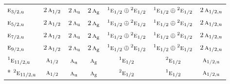 \documentclass[10pt,a4paper]{article}
\numberwithin{equation}{section}
\newcommand{\irr}[1]{\text{\normalfont\scshape #1}}
\newcommand{\conjpair}[1]{{}^{#1}}
\newcommand{\ptag}[1]{\mathrm{#1}}
\begin{document}
{\begin{longtable}{@{}lcccccc@{}}
$\irr{e}_{3/2,\ptag{u}}$ & $2\,\irr{a}_{1/2}$ & $2\,\irr{a}_{\ptag{u}}$ & $2\,\irr{a}_{\ptag{g}}$ & $\conjpair{1}\irr{e}_{1/2}\oplus \conjpair{2}\irr{e}_{1/2}$ & $\conjpair{1}\irr{e}_{1/2}\oplus \conjpair{2}\irr{e}_{1/2}$ & $2\,\irr{a}_{1/2,\ptag{u}}$\\
$\irr{e}_{5/2,\ptag{u}}$ & $2\,\irr{a}_{1/2}$ & $2\,\irr{a}_{\ptag{u}}$ & $2\,\irr{a}_{\ptag{g}}$ & $\conjpair{1}\irr{e}_{1/2}\oplus \conjpair{2}\irr{e}_{1/2}$ & $\conjpair{1}\irr{e}_{1/2}\oplus \conjpair{2}\irr{e}_{1/2}$ & $2\,\irr{a}_{1/2,\ptag{u}}$\\
$\irr{e}_{7/2,\ptag{u}}$ & $2\,\irr{a}_{1/2}$ & $2\,\irr{a}_{\ptag{u}}$ & $2\,\irr{a}_{\ptag{g}}$ & $\conjpair{1}\irr{e}_{1/2}\oplus \conjpair{2}\irr{e}_{1/2}$ & $\conjpair{1}\irr{e}_{1/2}\oplus \conjpair{2}\irr{e}_{1/2}$ & $2\,\irr{a}_{1/2,\ptag{u}}$\\
$\irr{e}_{9/2,\ptag{u}}$ & $2\,\irr{a}_{1/2}$ & $2\,\irr{a}_{\ptag{u}}$ & $2\,\irr{a}_{\ptag{g}}$ & $\conjpair{1}\irr{e}_{1/2}\oplus \conjpair{2}\irr{e}_{1/2}$ & $\conjpair{1}\irr{e}_{1/2}\oplus \conjpair{2}\irr{e}_{1/2}$ & $2\,\irr{a}_{1/2,\ptag{u}}$\\
$\conjpair{1}\irr{e}_{11/2,\ptag{u}}$ & $\irr{a}_{1/2}$ & $\irr{a}_{\ptag{u}}$ & $\irr{a}_{\ptag{g}}$ & $\conjpair{1}\irr{e}_{1/2}$ & $\conjpair{2}\irr{e}_{1/2}$ & $\irr{a}_{1/2,\ptag{u}}$\\*
$\conjpair{2}\irr{e}_{11/2,\ptag{u}}$ & $\irr{a}_{1/2}$ & $\irr{a}_{\ptag{u}}$ & $\irr{a}_{\ptag{g}}$ & $\conjpair{2}\irr{e}_{1/2}$ & $\conjpair{1}\irr{e}_{1/2}$ & $\irr{a}_{1/2,\ptag{u}}$\\
\bottomrule\end{longtable}}
\end{document}

